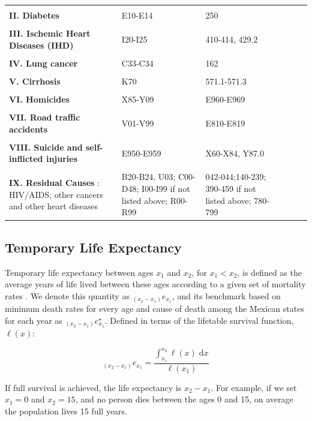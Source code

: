\documentclass[11.5pt]{article}
\newcommand{\dd}{\; \mathrm{d}}
\begin{document}
{\begin{longtable}{p{8cm}p{4cm}p{4cm}ccc}
 & \\          
 {\bf II. Diabetes}  & E10-E14 & 250 \\      
 & \\
 {\bf III. Ischemic Heart Diseases (IHD)}   & I20-I25 & 410-414, 429.2\\
 & \\                          
{\bf IV. Lung cancer}  & C33-C34 & 162\\
  & \\          
{\bf V. Cirrhosis}&  K70 & 571.1-571.3\\
 & \\          
{\bf VI. Homicides}  & X85-Y09 & E960-E969\\     
 & \\           
 {\bf VII. Road traffic accidents}  & V01-V99 & E810-E819 \\              
 & \\          
  {\bf VIII. Suicide and self-inflicted injuries}  & E950-E959 & X60-X84, Y87.0\\              
 & \\          
{\bf IX. Residual Causes }:  HIV/AIDS; other cancers and other heart diseases & B20-B24, U03; C00-D48; I00-I99 if not listed above; R00-R99 & 042-044;140-239; 390-459 if not listed above; 780-799
\label{ME_Mex}
\end{longtable}

\newpage

\subsection*{Temporary Life Expectancy}
Temporary life expectancy between ages
$x_1$ and $x_2$, for $x_1<x_2$, is defined as the average years of life lived between these ages according to a given set of mortality rates \citep{arriaga1984}. We denote this quantity as
$_{(x_2-x_1)}e_{x_1}$, and its benchmark based on minimum death rates for every age and cause of death among the Mexican states for each year as $_{(x_2-x_1)}e^{\star}_{x_1}$. Defined in
terms of the lifetable survival function, $\ell(x)$:

\begin{equation}
_{(x_2-x_1)}e_{x_1} = \frac{\int _{x_1}^{x_2} \ell(x) \dd x}{\ell(x_1)}
\end{equation}

If full survival is achieved, the life expectancy is $x_2-x_1$.  For example, if we set $x_1=0$ and $x_2=15$, and no person dies between the ages 0 and 15, on average the population lives 15 full years.

}
\end{document}
